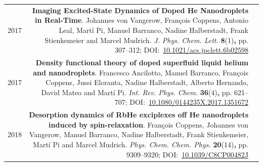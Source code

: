 \begin{tabular}{l!{\VRule}Rc}
		2017 & \textbf{Imaging Excited-State Dynamics of Doped He Nanodroplets in Real-Time}. Johannes von Vangerow, Fran\c{c}ois Coppens, Antonio Leal, Mart\'{i} Pi, Manuel Barranco, Nadine Halberstadt, Frank Stienkemeier and Marcel Mudrich. \emph{J. Phys. Chem. Lett.} \textbf{8}(1)\textbf{,} pp. 307--312; DOI:~\href{http://dx.doi.org/10.1021/acs.jpclett.6b02598}{10.1021/acs.jpclett.6b02598}&\vspace{20pt}\\
		2017 & \textbf{Density functional theory of doped superfluid liquid helium and nanodroplets}. Francesco Ancilotto, Manuel Barranco, Fran\c{c}ois Coppens, Jussi Eloranta, Nadine Halberstadt, Alberto Hernando, David Mateo and Mart\'{i} Pi. \emph{Int. Rev. Phys. Chem.} \textbf{36}(4)\textbf{,} pp. 621--707; DOI:~\href{http://dx.doi.org/10.1080/0144235X.2017.1351672}{10.1080/0144235X.2017.1351672}&\vspace{20pt}\\
		2018 & \textbf{Desorption dynamics of RbHe exciplexes off He nanodroplets induced by spin-relaxation}. Fran\c{c}ois Coppens, Johannes von Vangerow, Manuel Barranco, Nadine Halberstadt, Frank Stienkemeier, Mart\'{i} Pi and Marcel Mudrich. \emph{Phys. Chem. Chem. Phys.} \textbf{20}(14)\textbf{,} pp. 9309--9320; DOI:~\href{http://dx.doi.org/10.1039/C8CP00482J}{10.1039/C8CP00482J}&
		\end{tabular}
\clearpage{\pagestyle{empty}\cleardoublepage}